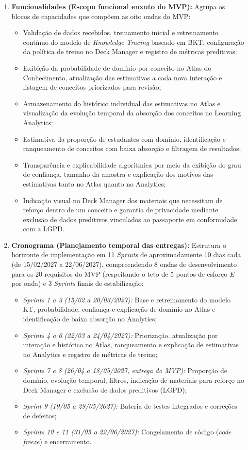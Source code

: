 \begin{enumerate}
    \item \textbf{Funcionalidades (Escopo funcional enxuto do MVP):} Agrupa os blocos de capacidades que compõem as oito ondas do MVP:
    \begin{itemize}
        \item Validação de dados recebidos, treinamento inicial e retreinamento contínuo do modelo de \textit{Knowledge Tracing} baseado em BKT, configuração da política de treino no Deck Manager e registro de métricas preditivas;
        \item Exibição da probabilidade de domínio por conceito no Atlas do Conhecimento, atualização das estimativas a cada nova interação e listagem de conceitos priorizados para revisão;
        \item Armazenamento do histórico individual das estimativas no Atlas e visualização da evolução temporal da absorção dos conceitos no Learning Analytics;
        \item Estimativa da proporção de estudantes com domínio, identificação e ranqueamento de conceitos com baixa absorção e filtragem de resultados;
        \item Transparência e explicabilidade algorítmica por meio da exibição do grau de confiança, tamanho da amostra e explicação dos motivos das estimativas tanto no Atlas quanto no Analytics;
        \item Indicação visual no Deck Manager dos materiais que necessitam de reforço dentro de um conceito e garantia de privacidade mediante exclusão de dados preditivos vinculados ao passaporte em conformidade com a LGPD.
    \end{itemize}

    \item \textbf{Cronograma (Planejamento temporal das entregas):} Estrutura o horizonte de implementação em 11 \textit{Sprints} de aproximadamente 10 dias cada (de 15/02/2027 a 22/06/2027), compreendendo 8 ondas de desenvolvimento para os 20 requisitos do MVP (respeitando o teto de 5 pontos de esforço \textit{E} por onda) e 3 \textit{Sprints} finais de estabilização:
    \begin{itemize}
        \item \textit{Sprints 1 a 3 (15/02 a 20/03/2027):} Base e retreinamento do modelo KT, probabilidade, confiança e explicação de domínio no Atlas e identificação de baixa absorção no Analytics;
        \item \textit{Sprints 4 a 6 (22/03 a 24/04/2027):} Priorização, atualização por interação e histórico no Atlas, ranqueamento e explicação de estimativas no Analytics e registro de métricas de treino;
        \item \textit{Sprints 7 e 8 (26/04 a 18/05/2027, entrega do MVP):} Proporção de domínio, evolução temporal, filtros, indicação de materiais para reforço no Deck Manager e exclusão de dados preditivos (LGPD);
        \item \textit{Sprint 9 (19/05 a 29/05/2027):} Bateria de testes integrados e correções de defeitos;
        \item \textit{Sprints 10 e 11 (31/05 a 22/06/2027):} Congelamento de código (\textit{code freeze}) e encerramento.
    \end{itemize}


\end{enumerate}
